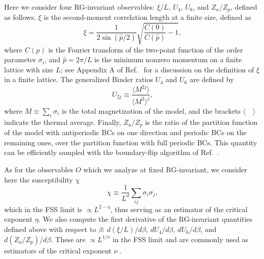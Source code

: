 \documentclass[pre,twocolumn]{revtex4-2}
\def\<{\langle}
\def\>{\rangle}
\begin{document}
Here we consider four RG-invariant observables: $\xi/L$, $U_4$, $U_6$, and $Z_a/Z_p$, defined as follows.
$\xi$ is the second-moment correlation length at a finite size, defined as
\begin{equation}
  \xi = \frac{1}{2\sin \left(\hat{p}/2\right)}\sqrt{\frac{C(0)}{C(\hat{p})}-1},
  \label{xi}
\end{equation}
where $C(p)$ is the Fourier transform of the two-point function of the order parameter $\sigma_i$, and $\hat{p} = 2\pi/L$ is the minimum nonzero momentum on a finite lattice with size $L$;
see Appendix A of Ref.~\cite{PTHAH-14} for a discussion on the definition of $\xi$ in a finite lattice.
The generalized Binder ratios $U_4$ and $U_6$ are defined by
\begin{equation}
  U_{2j} \equiv \frac{\<M^{2j}\>}{\<M^2\>^j},
  \label{binder}
\end{equation}
where $M\equiv \sum_i\sigma_i$ is the total magnetization of the model, and the brackets $\<\quad\>$ indicate the thermal average.
Finally, $Z_a/Z_p$ is the ratio of the partition function of the model with antiperiodic BCs on one direction and periodic BCs on the remaining ones, over the partition function with full periodic BCs.
This quantity can be efficiently sampled with the boundary-flip algorithm of Ref.~\cite{Hasenbusch-93,Hasenbusch-01}.

As for the observables $O$ which we analyze at fixed RG-invariant, we consider here the susceptibility $\chi$
\begin{equation}
  \chi \equiv \frac{1}{L^d} \sum_{i j} \sigma_i \sigma_j,
  \label{chi}
\end{equation}
which in the FSS limit is $\propto L^{2-\eta}$, thus serving as an estimator of the critical exponent $\eta$.
We also compute the first derivative of the RG-invariant quantities defined above with respect to $\beta$: $d(\xi/L)/d\beta$, $dU_4/d\beta$, $dU_6/d\beta$, and $d(Z_a/Z_p)/d\beta$. These are $\propto L^{1/\nu}$ in the FSS limit and are commonly used as estimators of the critical exponent $\nu$ \cite{Privman-90}.
\end{document}
